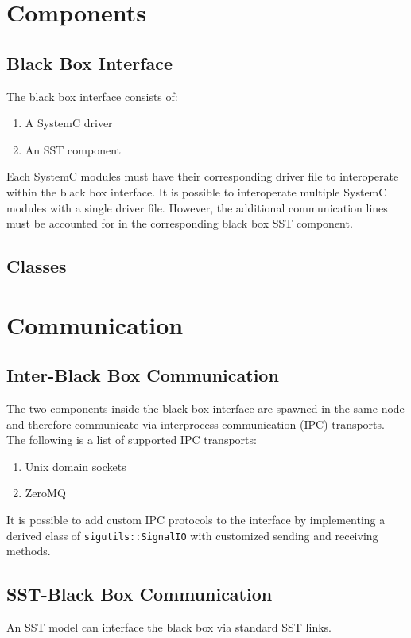 \documentclass{article}
\begin{document}
  \section{Components} \label{sec:comp}

    \subsection{Black Box Interface}
    The black box interface consists of:
    \begin{enumerate}
        \item A SystemC driver
        \item An SST component
    \end{enumerate}

    Each SystemC modules must have their corresponding driver file to interoperate within the black box interface. It is possible to interoperate multiple SystemC modules with a single driver file. However, the additional communication lines must be accounted for in the corresponding black box SST component.

    \subsection{Classes}

  \section{Communication} \label{sec:comm}

    \subsection{Inter-Black Box Communication}
    The two components inside the black box interface are spawned in the same node and therefore communicate via interprocess communication (IPC) transports. The following is a list of supported IPC transports:
    \begin{enumerate}
        \item Unix domain sockets
        \item ZeroMQ
    \end{enumerate}

    It is possible to add custom IPC protocols to the interface by implementing a derived class of \lstinline{sigutils::SignalIO} with customized sending and receiving methods.

    \subsection{SST-Black Box Communication}
    An SST model can interface the black box via standard SST links.
\end{document}
